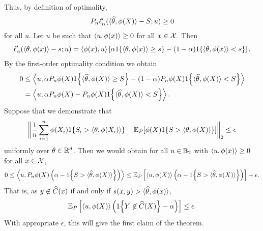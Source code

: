 \documentclass{article}
\newcommand{\loss}{\ell}
\newcommand{\scorefunc}{s}
\newcommand{\scoreval}{\scorefunc}
\newcommand{\scorerv}{S}
\begin{document}
Thus, by definition of optimality,
\begin{align*}
  P_n \loss_\alpha'(\<\what{\theta}, \phi(X)\> - \scorerv; u) \ge 0
\end{align*}
for all $u$.
%
Let $u$ be such that $\langle u, \phi(x)\rangle \ge 0$ for all $x \in \mathcal{X}$. Then
\begin{equation*}
  \loss_\alpha'(\<\theta, \phi(x)\> - \scoreval; u)
  = \<\phi(x), u\>
  \left[\alpha \indic{\<\theta, \phi(x)\> \ge \scoreval}
    - (1 - \alpha) \indic{\<\theta, \phi(x)\> < \scoreval}\right].
\end{equation*}
By the first-order optimality condition we obtain
\begin{align*}
  0 & \le \left\<u, \alpha P_n \phi(X) \indic{\<\what{\theta}, \phi(X)\>
    \ge \scorerv} - (1 - \alpha) P_n\phi(X)
  \indic{\<\what{\theta}, \phi(X)\> < \scorerv}\right\> \\
  & = \left\<u, \alpha P_n \phi(X)
  - P_n \phi(X) \indic{\<\what{\theta}, \phi(X)\>
    < \scorerv} \right\>.
\end{align*}
Suppose that we demonstrate that
\begin{equation*}
  \ltwobigg{\frac{1}{n} \sum_{i = 1}^n \phi(X_i) \indic{\scorerv_i >
      \<\theta, \phi(X_i)\>}
    -
  \E_P[\phi(X) \indic{\scorerv > \<\theta, \phi(X)\>}]} \le \epsilon
\end{equation*}
uniformly over $\theta \in \mathbb{R}^d$.
%
Then we would obtain
for all $u \in \mathbb{B}_2$ with $\langle u, \phi(x)\rangle \ge 0$ for all $x \in \mathcal{X}$,
\begin{equation*}
  0 \le \left\<u, P_n \phi(X) \left(\alpha - \indic{\scorerv >
    \<\what{\theta}, \phi(X)\>}\right)\right\>
  \le \E_P\left[\<u, \phi(X)\> \left(\alpha - \indic{\scorerv
      > \<\what{\theta}, \phi(X)\>}\right)\right]
  + \epsilon.
\end{equation*}
That is,
as $y \not \in \widehat{C}(x)$ if and only if
$\scoreval(x, y) > \<\what{\theta}, \phi(x)\>$,
\begin{equation}
  \label{eqn:one-sided-thing-to-prove}
  \mathbb{E}_P\left[\langle u, \phi(X)\rangle \left(
    1\!\left\{Y \not \in \widehat{C}(X)\right\} - \alpha\right)\right]
  \le \epsilon.
\end{equation}
%
With appropriate $\epsilon$, this will give the first claim of the theorem.
\end{document}
